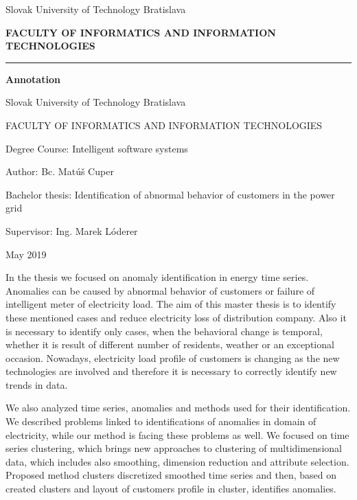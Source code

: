 \documentclass[a4paper,twoside,slovak,12pt,appendix]{article}
\begin{document}
\begin{titlepage}
\begin{center}
  {\small Slovak University of Technology Bratislava \par}
  {\small \textbf{FACULTY OF INFORMATICS AND INFORMATION TECHNOLOGIES}}
  \rule{\textwidth}{1pt}

  \vspace*{1.5cm}
  \begin{Large}
    \textbf{Annotation} \par
  \end{Large}
\end{center}
{Slovak University of Technology Bratislava \par}
{FACULTY OF INFORMATICS AND INFORMATION TECHNOLOGIES \par}
{Degree Course: Intelligent software systems \par}
{Author: Bc. Matúš Cuper \par}
{Bachelor thesis: Identification of abnormal behavior of customers in the power grid \par}
{Supervisor: Ing. Marek Lóderer \par}
{May 2019 \par}
\bigskip
In the thesis we focused on anomaly identification in energy time series.
Anomalies can be caused by abnormal behavior of customers or failure of
intelligent meter of electricity load. The aim of this master thesis is to
identify these mentioned cases and reduce electricity loss of distribution
company. Also it is necessary to identify only cases, when the behavioral change
is temporal, whether it is result of different number of residents, weather or
an exceptional occasion. Nowadays, electricity load profile of customers is
changing as the new technologies are involved and therefore it is necessary to
correctly identify new trends in data.

We also analyzed time series, anomalies and methods used for their
identification. We described problems linked to identifications of anomalies in
domain of electricity, while our method is facing these problems as well. We
focused on time series clustering, which brings new approaches to clustering of
multidimensional data, which includes also smoothing, dimension reduction and
attribute selection. Proposed method clusters discretized smoothed time series
and then, based on created clusters and layout of customers profile in cluster,
identifies anomalies.
\end{titlepage}
\newpage\null\thispagestyle{empty}\newpage
\end{document}
